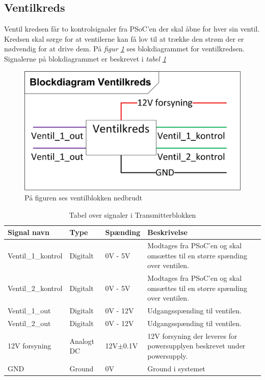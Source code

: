 \subsection{Ventilkreds}
\label{sec:ventilkreds}
Ventil kredsen får to kontrolsignaler fra PSoC'en der skal åbne for hver sin ventil. Kredsen skal sørge for at ventilerne kan få lov til at trække den strøm der er nødvendig for at drive dem. På \textit{figur \ref{fig:ventilblok}} ses blokdiagrammet for ventilkredsen. Signalerne på blokdiagrammet er beskrevet i \textit{tabel \ref{table:ventrilkreds}}
\begin{figure}[H]
\centering
\includegraphics[scale=1]{billeder/ventilblok}
\caption{På figuren ses ventilblokken nedbrudt}
\label{fig:ventilblok}
\end{figure}
\begin{table}[H]
\begin{tabular}{|p{3cm}|p{3cm}|p{3cm}|p{4.5cm}|} \hline
\cellcolor[gray]{0.85}Signal navn& \cellcolor[gray]{0.85}Type &\cellcolor[gray]{0.85}Spænding&\cellcolor[gray]{0.85}Beskrivelse\\ \hline
Ventil\_1\_kontrol & Digitalt & 0V - 5V & Modtages fra PSoC'en og skal omsættes til en større spænding over ventilen.\\ \hline
Ventil\_2\_kontrol & Digitalt & 0V - 5V & Modtages fra PSoC'en og skal omsættes til en større spænding over ventilen.\\ \hline
Ventil\_1\_out & Digitalt & 0V - 12V & Udgangsspænding til ventilen.\\ \hline
Ventil\_2\_out & Digitalt & 0V - 12V & Udgangsspænding til ventilen.\\ \hline
12V forsyning & Analogt DC & 12V$\pm$0.1V & 12V forsyning der leveres for powersupplyen beskrevet under powersupply.\\ \hline
GND & Ground & 0V & Ground i systemet \\ \hline
\end{tabular}
\caption{Tabel over signaler i Transmitterblokken}
\label{table:ventrilkreds}
\end{table}
\newpage
